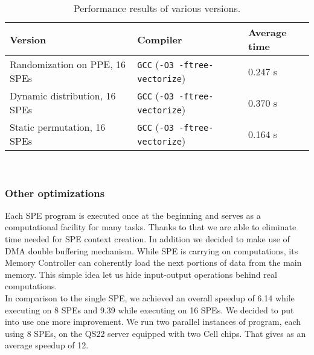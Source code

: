\begin{table}[htb]
\begin{footnotesize}
\caption{Performance results of various versions.}
\label{tab:t2}
\newcommand{\m}{\hphantom{$-$}}
\newcommand{\cc}[1]{\multicolumn{1}{c}{#1}}
\renewcommand{\tabcolsep}{0.5pc} %
\renewcommand{\arraystretch}{1.2} %
\begin{tabular}{@{}lll}
\hline
\textbf{Version} & \textbf{Compiler} & \textbf{Average time} \\
\hline
Randomization on PPE, 16 SPEs & \texttt{GCC} (\texttt{-O3 -ftree-vectorize}) & 0.247 s \\
Dynamic distribution, 16 SPEs & \texttt{GCC} (\texttt{-O3 -ftree-vectorize}) &  0.370 s \\
Static permutation, 16 SPEs & \texttt{GCC} (\texttt{-O3 -ftree-vectorize}) & 0.164 s \\
\hline
\end{tabular}\\[2pt]
\end{footnotesize}
\end{table}

\subsubsection{Other optimizations}
Each SPE program is executed once at the beginning and serves as a computational
facility for many tasks.
Thanks to that we are able to eliminate time needed for SPE context creation.
In addition we decided to make use of DMA double buffering
mechanism.
While SPE is carrying on computations, its Memory Controller can coherently load
the next portions of data from the main memory.
This simple idea let us hide input-output operations behind real computations.\\
In comparison to the single SPE, we achieved an overall speedup of 6.14 while
executing on 8 SPEs and 9.39 while executing on 16 SPEs.
We decided to put into use one more improvement.
We run two parallel instances of \prog{} program, each using 8 SPEs, on the
QS22 server equipped with two Cell chips.
That gives as an average speedup of 12.

